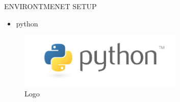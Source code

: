 
\sloppy
{\fontsize{14pt}{14pt}\selectfont ENVIRONTMENET SETUP \\} \par

\begin{itemize}
	\item python
\end{itemize}
\begin{figure}[ht]
	\centerline{\includegraphics[width=0.70\textwidth]{figures/python}}
	\caption{Logo}
	\label{Logo}
\end{figure}

